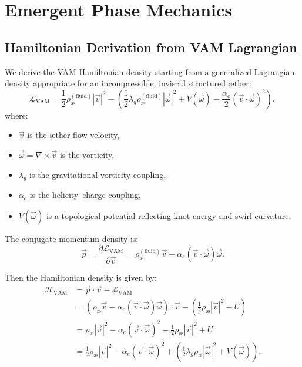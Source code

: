 \section{Emergent Phase Mechanics}
\subsection{Hamiltonian Derivation from VAM Lagrangian}

We derive the VAM Hamiltonian density starting from a generalized Lagrangian density appropriate for an incompressible, inviscid structured \ae ther:
\begin{equation}
\mathcal{L}_\text{VAM} = \frac{1}{2} \rho_\text{\ae}^{(\text{fluid})} |\vec{v}|^2
- \left( \frac{1}{2} \lambda_g \rho_\text{\ae}^{(\text{fluid})} |\vec{\omega}|^2
+ V(\vec{\omega}) - \frac{\alpha_e}{2} (\vec{v} \cdot \vec{\omega})^2 \right),
\end{equation}
where:
\begin{itemize}
  \item $\vec{v}$ is the \ae ther flow velocity,
  \item $\vec{\omega} = \nabla \times \vec{v}$ is the vorticity,
  \item $\lambda_g$ is the gravitational vorticity coupling,
  \item $\alpha_e$ is the helicity--charge coupling,
  \item $V(\vec{\omega})$ is a topological potential reflecting knot energy and swirl curvature.
\end{itemize}

The conjugate momentum density is:
\begin{equation}
\vec{p} = \frac{\partial \mathcal{L}_\text{VAM}}{\partial \vec{v}}
= \rho_\text{\ae}^{(\text{fluid})} \vec{v}
- \alpha_e (\vec{v} \cdot \vec{\omega}) \vec{\omega}.
\end{equation}

Then the Hamiltonian density is given by:
\begin{align*}
\mathcal{H}_\text{VAM} &= \vec{p} \cdot \vec{v} - \mathcal{L}_\text{VAM} \\
&= \left( \rho_\text{\ae} \vec{v} - \alpha_e (\vec{v} \cdot \vec{\omega}) \vec{\omega} \right) \cdot \vec{v}
- \left( \frac{1}{2} \rho_\text{\ae} |\vec{v}|^2 - U \right) \\
&= \rho_\text{\ae} |\vec{v}|^2 - \alpha_e (\vec{v} \cdot \vec{\omega})^2
- \frac{1}{2} \rho_\text{\ae} |\vec{v}|^2 + U \\
&= \frac{1}{2} \rho_\text{\ae} |\vec{v}|^2
- \alpha_e (\vec{v} \cdot \vec{\omega})^2
+ \left( \frac{1}{2} \lambda_g \rho_\text{\ae} |\vec{\omega}|^2 + V(\vec{\omega}) \right).
\end{align*}


